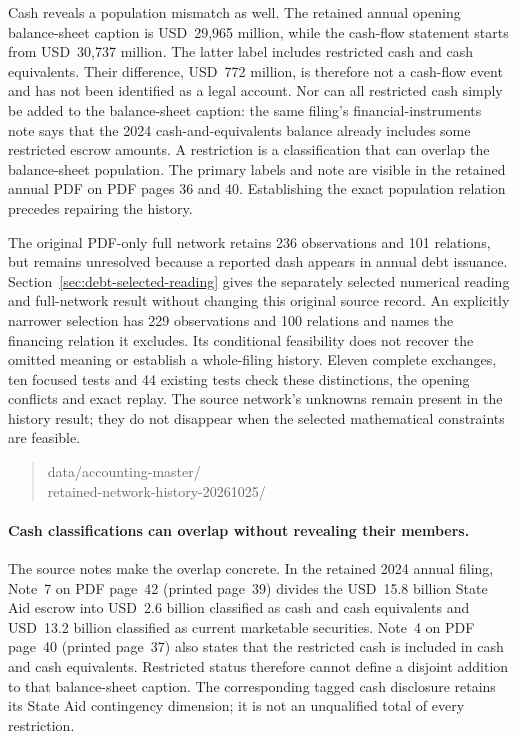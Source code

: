 Cash reveals a population mismatch as well. The retained annual opening
balance-sheet caption is USD~29,965 million, while the cash-flow statement
starts from USD~30,737 million. The latter label includes restricted cash
and cash equivalents. Their difference, USD~772 million, is therefore not a
cash-flow event and has not been identified as a legal account. Nor can all
restricted cash simply be added to the balance-sheet caption: the same
filing's financial-instruments note says that the 2024 cash-and-equivalents
balance already includes some restricted escrow amounts. A restriction is a
classification that can overlap the balance-sheet population. The primary
labels and note are visible in the retained annual PDF on PDF pages 36 and
40. Establishing the exact population relation precedes repairing the history.

The original PDF-only full network retains 236 observations and 101 relations,
but remains unresolved because a reported dash appears in annual debt issuance.
Section~\ref{sec:debt-selected-reading} gives the separately selected numerical
reading and full-network result without changing this original source record.
An explicitly narrower selection has 229 observations and 100 relations and
names the financing relation it excludes. Its conditional feasibility does
not recover the omitted meaning or establish a whole-filing history. Eleven
complete exchanges, ten focused tests and 44 existing tests check these
distinctions, the opening conflicts and exact replay. The source network's
unknowns remain present in the history result; they do not disappear when
the selected mathematical constraints are feasible.
\begin{quote}\small\ttfamily
data/accounting-master/\\
retained-network-history-20261025/
\end{quote}


\paragraph{Cash classifications can overlap without revealing their members.}
The source notes make the overlap concrete. In the retained 2024 annual filing,
Note~7 on PDF page~42 (printed page~39) divides the USD~15.8 billion State Aid
escrow into USD~2.6 billion classified as cash and cash equivalents and
USD~13.2 billion classified as current marketable securities. Note~4 on PDF
page~40 (printed page~37) also states that the restricted cash is included in
cash and cash equivalents. Restricted status therefore cannot define a
disjoint addition to that balance-sheet caption. The corresponding tagged
cash disclosure retains its State Aid contingency dimension; it is not an
unqualified total of every restriction.

